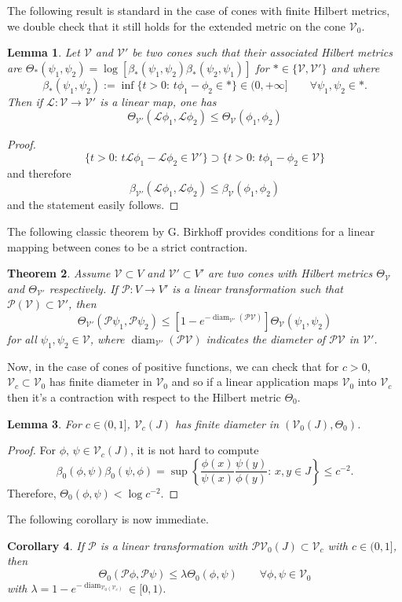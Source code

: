 \documentclass{article}
\DeclareMathOperator{\diam}{diam}
\newcommand{\1}{\mathbbm{1}}
\newcommand{\mc}{\mathcal}
\newtheorem{theorem}{Theorem}[section]
\newtheorem{corollary}[theorem]{Corollary}
\newtheorem{lemma}[theorem]{Lemma}
\begin{document}
The following result is standard in the case of cones with finite Hilbert metrics, we double check that it still holds for the extended metric on the  cone $\mc V_{0}$.
\begin{lemma}\label{Lem:ContHilb}
Let $\mc V$ and $\mc V'$ be  two cones such that their associated Hilbert metrics are $\Theta_*(\psi_1,\psi_2)=\log[\beta_*(\psi_1,\psi_2)\beta_*(\psi_2,\psi_1)]$ for $*\in\{\mc V,\mc V'\}$ and where
\[
\beta_*(\psi_1,\psi_2):=\inf\{t>0:\,t\phi_1- \phi_2\in *\}\in(0,+\infty] \quad\quad\forall \psi_1,\psi_2\in *.
\]
Then if $\mc L:\mc V\rightarrow \mc V'$ is a linear map, one has
\[
\Theta_{\mc V'}(\mc L\phi_1,\mc L \phi_2)\le \Theta_{\mc V}(\phi_1,\phi_2)
\]
\end{lemma}
\begin{proof}
\[
\{t>0:\,t\mc L\phi_1- \mc L\phi_2\in \mc V'\}\supset \{t>0:\,t\phi_1- \phi_2\in \mc V\}
\]
and therefore
\[
\beta_{\mc V'}(\mc L\phi_1,\mc L\phi_2)\le \beta_{\mc V}(\phi_1,\phi_2)
\]
and the statement easily follows.
\end{proof}

The following classic theorem by G. Birkhoff provides conditions for a linear mapping between cones to be a strict contraction.
\begin{theorem}\label{Thm:ContCones}
Assume $\mc V\subset V$ and $\mc V'\subset V'$ are two  cones with Hilbert metrics $\Theta_{\mc V}$ and $\Theta_{\mc V'}$ respectively. If $\mc P: V\rightarrow  V'$ is a linear transformation such that $\mc P(\mc V)\subset \mc V'$, then
\[
\Theta_{\mc V'}(\mc P\psi_1,\mc P\psi_2)\le [1-e^{-\diam_{\mc V'}(\mc P\mc V)}] \Theta_{\mc V}(\psi_1,\psi_2)
\]
for all $\psi_1,\psi_2\in\mc V$,  where $\diam_{\mc V'}(\mc P\mc V)$ indicates the diameter of $\mc P\mc V$ in $\mc V'$.
\end{theorem}

Now, in the case of cones of positive functions, we can check that for $c>0$, $\mc V_c\subset \mc V_0$ has finite diameter in $\mc V_0$ and so if a linear application maps $\mc V_0$ into $\mc V_c$ then it's a contraction with respect to the Hilbert metric $\Theta_0$.


\begin{lemma}\label{Lem:FiniteDiam}
For $c\in(0,1]$, $\mc V_c(J)$ has finite diameter in $(\mc V_0(J),\Theta_0)$.
\end{lemma}
\begin{proof}
For $\phi,\,\psi\in \mc V_c(J)$, it is not hard to compute 
\[
\beta_0(\phi,\psi)\beta_0(\psi,\phi)=\sup\left\{\frac{\phi(x)}{\psi(x)}\frac{\psi(y)}{\phi(y)}:\,x,y\in J\right\}\le c^{-2}.
\]
Therefore, $\Theta_0(\phi,\psi)<\log c^{-2}$.
\end{proof}
The following corollary is now immediate.
\begin{corollary}\label{Cor:Contraction}
If $\mc P$ is a linear transformation with $\mc P\mc V_0(J)\subset \mc V_c$ with $c\in(0,1]$, then
\[
\Theta_0(\mc P\phi,\mc P\psi)\le \lambda\Theta_0(\phi,\psi)\quad\quad\forall\phi,\psi\in\mc V_0
\]
with $\lambda=1-e^{-\diam_{\mc V_0(\mc V_c)}}\in[0,1)$.
\end{corollary}
\end{document}
